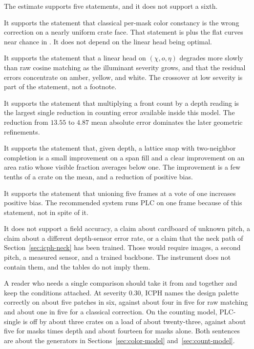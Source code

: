 The estimate supports five statements, and it does not support a sixth.

It supports the statement that classical per-mask color constancy is the wrong correction on a nearly uniform crate face. That statement is  plus the flat curves near chance in . It does not depend on the linear head being optimal.

It supports the statement that a linear head on $(\chi,o,\eta)$ degrades more slowly than raw cosine matching as the illuminant severity grows, and that the residual errors concentrate on amber, yellow, and white. The crossover at low severity is part of the statement, not a footnote.

It supports the statement that multiplying a front count by a depth reading is the largest single reduction in counting error available inside this model. The reduction from $13.55$ to $4.87$ mean absolute error dominates the later geometric refinements.

It supports the statement that, given depth, a lattice snap with two-neighbor completion is a small improvement on a span fill and a clear improvement on an area ratio whose visible fraction averages below one. The improvement is a few tenths of a crate on the mean, and a reduction of positive bias.

It supports the statement that unioning five frames at a vote of one increases positive bias. The recommended system runs PLC on one frame because of this statement, not in spite of it.

It does not support a field accuracy, a claim about cardboard of unknown pitch, a claim about a different depth-sensor error rate, or a claim that the neck path of Section~\ref{sec:icph-neck} has been trained. Those would require images, a second pitch, a measured sensor, and a trained backbone. The instrument does not contain them, and the tables do not imply them.

A reader who needs a single comparison should take it from  and  together and keep the conditions attached. At severity $0.30$, ICPH names the design palette correctly on about five patches in six, against about four in five for raw matching and about one in five for a classical correction. On the counting model, PLC-single is off by about three crates on a load of about twenty-three, against about five for masks times depth and about fourteen for masks alone. Both sentences are about the generators in Sections~\ref{sec:color-model} and~\ref{sec:count-model}.

